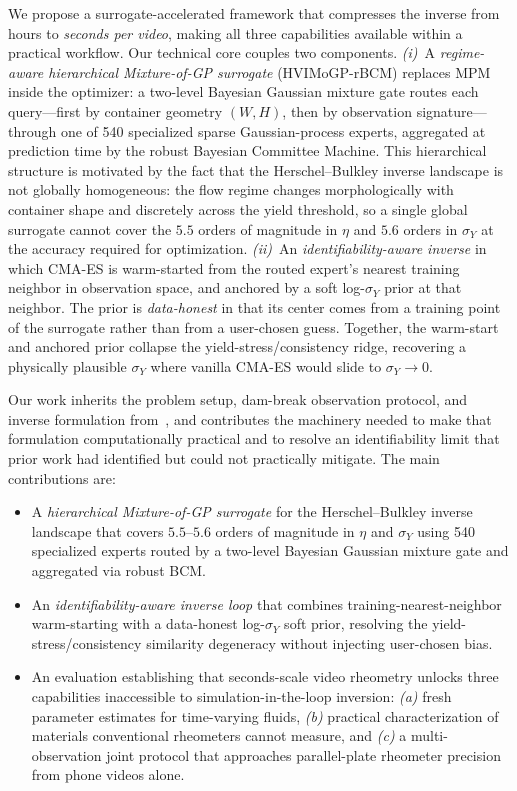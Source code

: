 We propose a surrogate-accelerated framework that compresses the
inverse from hours to \emph{seconds per video}, making all three
capabilities available within a practical workflow. Our technical core
couples two components.
\emph{(i)}~A \emph{regime-aware hierarchical Mixture-of-GP surrogate}
(HVIMoGP-rBCM) replaces MPM inside the optimizer: a two-level Bayesian
Gaussian mixture gate routes each query---first by container geometry
$(W, H)$, then by observation signature---through one of 540 specialized
sparse Gaussian-process experts, aggregated at prediction time by the
robust Bayesian Committee Machine. This hierarchical structure is
motivated by the fact that the Herschel--Bulkley inverse landscape is
not globally homogeneous: the flow regime changes morphologically with
container shape and discretely across the yield threshold, so a single
global surrogate cannot cover the $5.5$ orders of magnitude in $\eta$
and $5.6$ orders in $\sigma_Y$ at the accuracy required for optimization.
\emph{(ii)}~An \emph{identifiability-aware inverse} in which CMA-ES is
warm-started from the routed expert's nearest training neighbor in
observation space, and anchored by a soft log-$\sigma_Y$ prior at that
neighbor. The prior is \emph{data-honest} in that its center comes from
a training point of the surrogate rather than from a user-chosen guess.
Together, the warm-start and anchored prior collapse the
yield-stress/consistency ridge, recovering a physically plausible
$\sigma_Y$ where vanilla CMA-ES would slide to $\sigma_Y \to 0$.

Our work inherits the problem setup, dam-break observation protocol, and
inverse formulation from~\cite{hamamichi2023nonnewtonian}, and
contributes the machinery needed to make that formulation
computationally practical and to resolve an identifiability limit that
prior work had identified but could not practically mitigate. The main
contributions are:

\begin{itemize}
    \item A \emph{hierarchical Mixture-of-GP surrogate} for the
    Herschel--Bulkley inverse landscape that covers
    $5.5$--$5.6$ orders of magnitude in $\eta$ and $\sigma_Y$ using 540
    specialized experts routed by a two-level Bayesian Gaussian mixture
    gate and aggregated via robust BCM.
    \item An \emph{identifiability-aware inverse loop} that combines
    training-nearest-neighbor warm-starting with a data-honest
    log-$\sigma_Y$ soft prior, resolving the yield-stress/consistency
    similarity degeneracy without injecting user-chosen bias.
    \item An evaluation establishing that seconds-scale video rheometry
    unlocks three capabilities inaccessible to simulation-in-the-loop
    inversion: \emph{(a)} fresh parameter estimates for time-varying
    fluids, \emph{(b)} practical characterization of materials
    conventional rheometers cannot measure, and \emph{(c)} a
    multi-observation joint protocol that approaches parallel-plate
    rheometer precision from phone videos alone.
\end{itemize}

